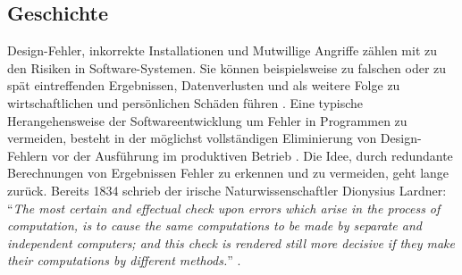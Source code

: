 \subsection{Geschichte}\label{geschichte}

Design-Fehler, inkorrekte Installationen und Mutwillige Angriffe zählen mit zu den Risiken in Software-Systemen. Sie können beispielsweise zu falschen oder zu spät eintreffenden Ergebnissen, Datenverlusten und als weitere Folge zu wirtschaftlichen und persönlichen Schäden führen \cite{Laprie:1995:DCC:1899254.1899261}.
Eine typische Herangehensweise der Softwareentwicklung um Fehler in Programmen zu vermeiden, besteht in der möglichst vollständigen Eliminierung von Design-Fehlern vor der Ausführung im produktiven Betrieb \cite{Avizienis:1975:FFC:800027.808469}. 
Die Idee, durch redundante Berechnungen von Ergebnissen Fehler zu erkennen und zu vermeiden, geht lange zurück. Bereits 1834 schrieb der irische Naturwissenschaftler Dionysius Lardner: \enquote{\emph{The most certain and effectual check upon errors which arise in the process of computation,	is to cause the same computations to be made by separate and independent computers; and this	check is rendered still more decisive if they make their computations by different methods.}} \cite{lardner}.

